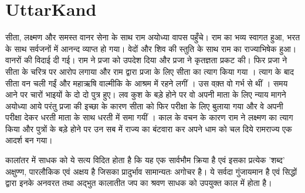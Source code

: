 \documentclass[makeidx, 10pt, oneside, onecolumn, openright, final, svgnames, dvipsnames, extrafontsizes]{memoir}
\begin{document}
\chapter[उत्तरकाण्ड]{UttarKand}
\thispagestyle{empty}

\hspace{5mm}सीता, लक्ष्मण और समस्त वानर सेना के साथ राम अयोध्या वापस पहुँचे। राम का भव्य स्वागत हुआ, भरत के साथ सर्वजनों में आनन्द व्याप्त हो गया। वेदों और शिव की स्तुति के साथ राम का राज्याभिषेक हुआ। वानरों की विदाई दी गई। राम ने प्रजा को उपदेश दिया और प्रजा ने कृतज्ञता प्रकट की। फिर प्रजा ने सीता के चरित्र पर आरोप लगाया और राम द्वारा प्रजा के लिए सीता का त्याग किया गया । त्याग के बाद सीता वन चली गईं और महाऋषि वाल्मीकि के आश्रम में रहने लगीं । उस वक़्त वो गर्भ से थीं । समय आने पर चारों भाइयों के दो दो पुत्र हुए। लव कुश के बड़े होने पर वो अपनी माता के लिए न्याय मागने अयोध्या आये परंतु प्रजा की इच्छा के कारण सीता को फिर परीक्षा के लिए बुलाया गया और वे अपनी परीक्षा देकर धरती माता के साथ धरती में समा गयीं । काल के वचन के कारण राम ने लक्ष्मण का त्याग किया और पुत्रों के बड़े होने पर उन सब में राज्य का बंटवारा कर अपने धाम को चल दिये रामराज्य एक आदर्श बन गया। 




\vspace{1mm}

\hspace{5mm} कालांतर में साधक को ये सत्य विदित होता है कि यह एक सार्वभौम क्रिया है एवं इसका प्रत्येक 'शब्द' अक्षुण्ण, पारलौकिक एवं अक्षय है जिसका प्रादुर्भाव सामान्यतः अगोचर है। ये सर्वदा गुंजायमान है एवं सिद्धों द्वारा इनके अनवरत तथा अद्भुत कालातीत जप का श्रवण साधक को उपयुक्त काल में होता है। 
\end{document}
